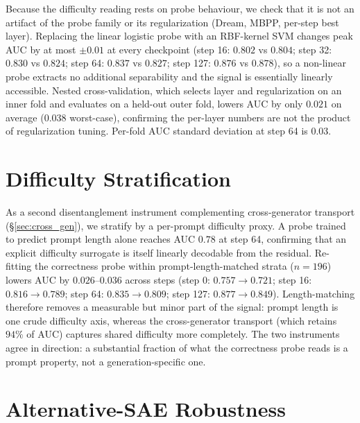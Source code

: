 \documentclass[11pt]{article}
\begin{document}
Because the difficulty reading rests on probe behaviour, we check that it is not an artifact of the probe family or its regularization (Dream, MBPP, per-step best layer).
Replacing the linear logistic probe with an RBF-kernel SVM changes peak AUC by at most $\pm 0.01$ at every checkpoint (step 16: $0.802$ vs $0.804$; step 32: $0.830$ vs $0.824$; step 64: $0.837$ vs $0.827$; step 127: $0.876$ vs $0.878$), so a non-linear probe extracts no additional separability and the signal is essentially linearly accessible.
Nested cross-validation, which selects layer and regularization on an inner fold and evaluates on a held-out outer fold, lowers AUC by only $0.021$ on average ($0.038$ worst-case), confirming the per-layer numbers are not the product of regularization tuning.
Per-fold AUC standard deviation at step 64 is $0.03$.

\section{Difficulty Stratification}
\label{sec:appendix_stratify}

As a second disentanglement instrument complementing cross-generator transport (\S\ref{sec:cross_gen}), we stratify by a per-prompt difficulty proxy.
A probe trained to predict prompt length alone reaches AUC $0.78$ at step 64, confirming that an explicit difficulty surrogate is itself linearly decodable from the residual.
Re-fitting the correctness probe within prompt-length-matched strata ($n{=}196$) lowers AUC by $0.026$--$0.036$ across steps (step 0: $0.757\!\to\!0.721$; step 16: $0.816\!\to\!0.789$; step 64: $0.835\!\to\!0.809$; step 127: $0.877\!\to\!0.849$).
Length-matching therefore removes a measurable but minor part of the signal: prompt length is one crude difficulty axis, whereas the cross-generator transport (which retains $94\%$ of AUC) captures shared difficulty more completely.
The two instruments agree in direction: a substantial fraction of what the correctness probe reads is a prompt property, not a generation-specific one.

\section{Alternative-SAE Robustness}
\label{sec:appendix_altsae}
\end{document}
